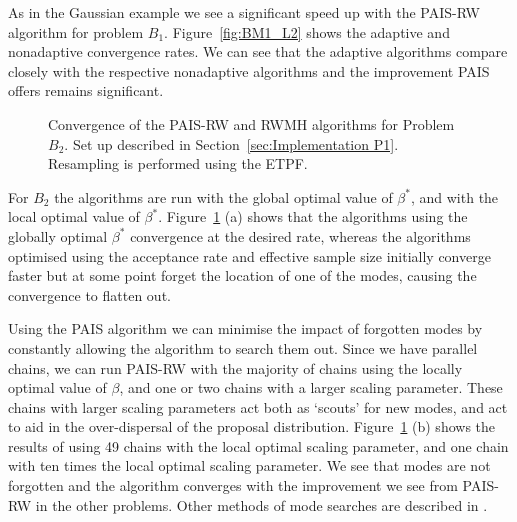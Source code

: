 \documentclass[final]{siamltex}
\begin{document}
As in the Gaussian example we see a significant speed up with the
PAIS-RW algorithm for problem $B_1$. Figure~\ref{fig:BM1_L2} shows the adaptive and nonadaptive convergence rates. We can see that the adaptive algorithms compare closely with the
respective nonadaptive algorithms and the improvement PAIS offers remains significant.

\begin{figure}[htb]
\centering
{}
\caption{Convergence of the PAIS-RW and RWMH algorithms for Problem $B_2$. Set up described in Section~\ref{sec:Implementation P1}. Resampling is performed using the ETPF.}
\label{fig:BM2_L2}
\end{figure}

For $B_2$ the algorithms are run with the global optimal value of $\beta^*$, and with the local optimal value of $\beta^*$. Figure~\ref{fig:BM2_L2} (a) shows that the algorithms using the globally optimal $\beta^*$ convergence at the desired rate, whereas the algorithms optimised using the acceptance rate and effective sample size initially converge faster but at some point forget the location of one of the modes, causing the convergence to flatten out.

Using the PAIS algorithm we can minimise the impact of forgotten modes by constantly allowing the algorithm to search them out. Since we have parallel chains, we can run PAIS-RW with the majority of chains using the locally optimal value of $\beta$, and one or two chains with a larger scaling parameter. These chains with larger scaling parameters act both as `scouts' for new modes, and act to aid in the over-dispersal of the proposal distribution. Figure~\ref{fig:BM2_L2} (b) shows the results of using 49 chains with the local optimal scaling parameter, and one chain with ten times the local optimal scaling parameter. We see that modes are not forgotten and the algorithm converges with the improvement we see from PAIS-RW in the other problems. Other methods of mode searches are described in \cite{lan2013wormhole}.
\end{document}
